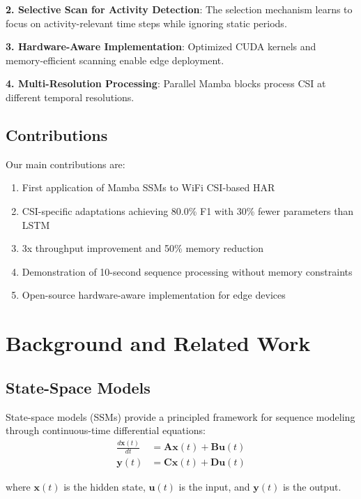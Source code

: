 \documentclass[10pt,conference]{IEEEtran}
\begin{document}
\textbf{2. Selective Scan for Activity Detection}: The selection mechanism learns to focus on activity-relevant time steps while ignoring static periods.

\textbf{3. Hardware-Aware Implementation}: Optimized CUDA kernels and memory-efficient scanning enable edge deployment.

\textbf{4. Multi-Resolution Processing}: Parallel Mamba blocks process CSI at different temporal resolutions.

\subsection{Contributions}

Our main contributions are:
\begin{enumerate}
    \item First application of Mamba SSMs to WiFi CSI-based HAR
    \item CSI-specific adaptations achieving 80.0\% F1 with 30\% fewer parameters than LSTM
    \item 3x throughput improvement and 50\% memory reduction
    \item Demonstration of 10-second sequence processing without memory constraints
    \item Open-source hardware-aware implementation for edge devices
\end{enumerate}

\section{Background and Related Work}
\label{sec:background}

\subsection{State-Space Models}

State-space models (SSMs) provide a principled framework for sequence modeling through continuous-time differential equations:
\begin{align}
    \frac{d\mathbf{x}(t)}{dt} &= \mathbf{A}\mathbf{x}(t) + \mathbf{B}\mathbf{u}(t) \\
    \mathbf{y}(t) &= \mathbf{C}\mathbf{x}(t) + \mathbf{D}\mathbf{u}(t)
\end{align}

where $\mathbf{x}(t)$ is the hidden state, $\mathbf{u}(t)$ is the input, and $\mathbf{y}(t)$ is the output.
\end{document}
